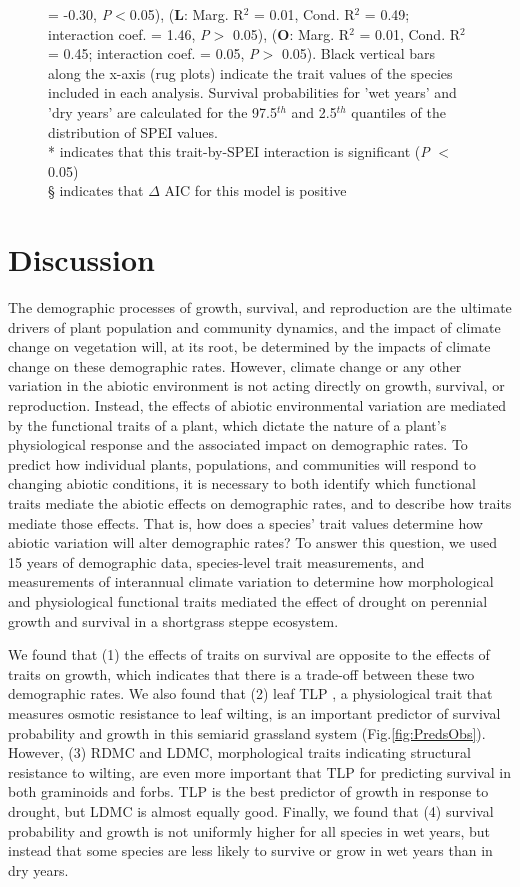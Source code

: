 \documentclass[12pt, letterpaper]{article}
\begin{document}
\begin{figure}
{= -0.30, \textit{P}$<$0.05), (\textbf{L}: Marg. R$^2$ = 0.01, Cond. R$^2$ = 0.49; interaction coef. = 1.46, \textit{P}$>$ 0.05), (\textbf{O}: Marg. R$^2$ = 0.01, Cond. R$^2$ = 0.45; interaction coef. = 0.05, \textit{P}$>$ 0.05). Black vertical bars along the x-axis (rug plots) indicate the trait values of the species included in each analysis. Survival probabilities for 'wet years' and 'dry years' are calculated for the 97.5$^{th}$ and 2.5$^{th}$ quantiles of the distribution of SPEI values. \\
* indicates that this trait-by-SPEI interaction is significant (\textit{P} $<$ 0.05)\\
§ indicates that $\Delta$ AIC for this model is positive
}
 \label{fig:test}
\end{figure}

\section{Discussion}
The demographic processes of growth, survival, and reproduction are the ultimate drivers of plant population and community dynamics, and the impact of climate change on vegetation will, at its root, be determined by the impacts of climate change on these demographic rates. However, climate change or any other variation in the abiotic environment is not acting directly on growth, survival, or reproduction. Instead, the effects of abiotic environmental variation are mediated by the functional traits of a plant, which dictate the nature of a plant's physiological response and the associated impact on demographic rates. To predict how individual plants, populations, and communities will respond to changing abiotic conditions, it is necessary to both identify which functional traits mediate the abiotic effects on demographic rates, and to describe how traits mediate those effects. That is, how does a species' trait values determine how abiotic variation will alter demographic rates? To answer this question, we used 15 years of demographic data, species-level trait measurements, and measurements of interannual climate variation to determine how morphological and physiological functional traits mediated the effect of drought on perennial growth and survival in a shortgrass steppe ecosystem. 

We found that (1) the effects of traits on survival are opposite to the effects of traits on growth, which indicates that there is a trade-off between these two demographic rates. We also found that (2) leaf TLP , a physiological trait that measures osmotic resistance to leaf wilting, is an important predictor of survival probability and growth in this semiarid grassland system (Fig.\ref{fig:PredsObs}). However, (3) RDMC and LDMC, morphological traits indicating structural resistance to wilting, are even more important that TLP for predicting survival in both graminoids and forbs. TLP is the best predictor of growth in response to drought, but LDMC is almost equally good. Finally, we found that (4) survival probability and growth is not uniformly higher for all species in wet years, but instead that some species are less likely to survive or grow in wet years than in dry years. 
\end{document}
